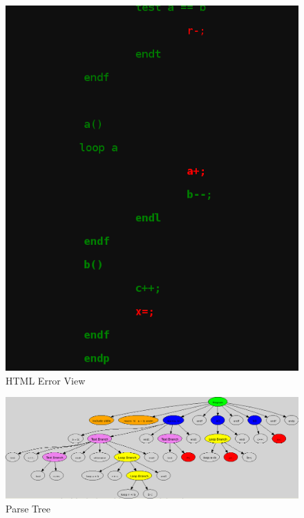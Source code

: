\documentclass[12pt, oneside, a4paper]{article}
\begin{document}
\newpage
\begin{figure}[htb]
\begin{center}
\ifpdf
	\includegraphics[scale=0.60]{example3.png}
\else
\fi
\caption{HTML Error View}
\end{center}
\end{figure}

\begin{figure}[htb]
\begin{center}
\ifpdf
	\includegraphics[scale=0.50]{parsetree.png}
\else
\fi
\caption{Parse Tree}
\end{center}
\end{figure}
\newpage 
\end{document}
